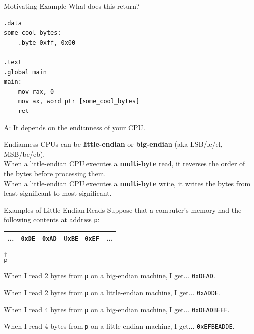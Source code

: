 \documentclass[hyphens,aspectratio=169,dvipsnames]{beamer}
\begin{document}
\begin{frame}[fragile]{Motivating Example}
    What does this return?
    \begin{verbatim}
.data
some_cool_bytes:
    .byte 0xff, 0x00

.text
.global main
main:
    mov rax, 0
    mov ax, word ptr [some_cool_bytes]
    ret
    \end{verbatim}

    \pause A: It depends on the endianness of your CPU.
\end{frame}

\begin{frame}{Endianness}
    CPUs can be \textbf{little-endian} or \textbf{big-endian} (aka LSB/le/el, MSB/be/eb). \\

    When a little-endian CPU executes a \textbf{multi-byte} read, it reverses the order of the bytes before processing them. \\

    When a little-endian CPU executes a \textbf{multi-byte} write, it writes the bytes from least-significant to most-significant.
\end{frame}

\begin{frame}{Examples of Little-Endian Reads}
    Suppose that a computer's memory had the following contents at address \texttt{p}:
    \begin{center}
        \begin{tabular}{c|c|c|c|c|c}
            \hline
            ... & \texttt{0xDE} & \texttt{0xAD} & 0\texttt{xBE} & \texttt{0xEF} & ... \\
            \hline
        \end{tabular}

            $\overset{\uparrow}{\texttt{p}}~~~~~~~~~~~~~~~~~~~~~~~~~~~~~~~~~~~~~~$ \\ %

    \end{center}

    When I read 2 bytes from \texttt{p} on a big-endian machine, I get... \pause \texttt{0xDEAD}.

    When I read 2 bytes from \texttt{p} on a little-endian machine, I get... \pause \texttt{0xADDE}.

    When I read 4 bytes from \texttt{p} on a big-endian machine, I get... \pause \texttt{0xDEADBEEF}.

    When I read 4 bytes from \texttt{p} on a little-endian machine, I get... \pause \texttt{0xEFBEADDE}.
\end{frame}
\end{document}
